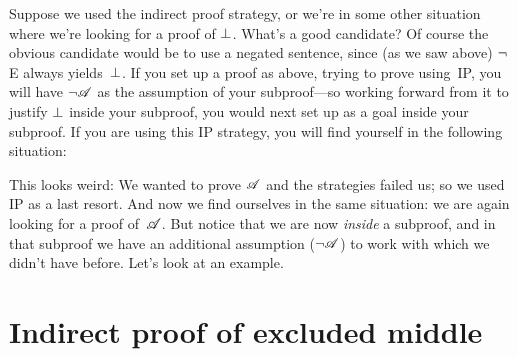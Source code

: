 Suppose we used the indirect proof strategy, or we're in some other situation where we're looking for a proof of $\bot$.  What's a good candidate? Of course the obvious candidate would be to use a negated sentence, since (as we saw above) $\neg$E always yields~$\bot$. If you set up a proof as above, trying to prove  using~IP, you will have $\neg \mathscr{A}$ as the assumption of your subproof---so working forward from it to justify $\bot$ inside your subproof, you would next set up  as a goal inside your subproof. If you are using this IP strategy, you will find yourself in the following situation: 
\begin{fitchproof}
\open
{}\AS
\ellipsesline
{}
\close
{}
\end{fitchproof} 
This looks weird: We wanted to prove $\mathscr{A}$ and the strategies failed us; so we used IP as a last resort. And now we find ourselves in the same situation: we are again looking for a proof of~$\mathscr{A}$. But notice that we are now \emph{inside} a subproof, and in that subproof we have an additional assumption ($\neg \mathscr{A}$) to work with which we didn't have before. Let's look at an example.

\section{Indirect proof of excluded middle}\label{s:proofLEM}

